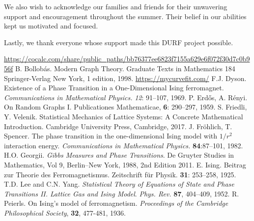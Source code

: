 \documentclass[11pt]{book}
\begin{document}
We also wish to acknowledge our families and friends for their unwavering support and encouragement throughout the summer. Their belief in our abilities kept us motivated and focused.

Lastly, we thank everyone whose support made this DURF project possible.

\begin{thebibliography}{9}
 \url{https://cocalc.com/share/public_paths/bb76377ee6823f7155a629e6f072f30d7c0b956f}
 B. Bollob\'{a}s. Modern Graph Theory. Graduate Texts in Mathematics 184 Springer-Verlag New York, 1 edition, 1998.
\url{https://mycurvefit.com/}
 F.J. Dyson. Existence of a Phase Transition in a One-Dimensional Ising ferromagnet. {\em Communications in Mathematical Physics.} {\em 12}: 91--107, 1969.
 P. Erd\H{o}s, A. R\'{e}nyi. On Random Graphs I. Publicationes Mathematicae, {\bf 6}: 290--297,  1959.
 S. Friedli, Y. Velenik. Statistical Mechanics of Lattice Systems: A Concrete Mathematical Introduction. Cambridge University Press, Cambridge, 2017.
 J. Fr\"ohlich, T. Spencer. The phase transition in the one-dimensional Ising model with $1/r^2$ interaction energy. {\em Communications in Mathematical Physics.} {\bf 84}:87--101, 1982.
 H.O. Georgii. {\em Gibbs Measures and Phase Transitions}. De Gruyter Studies in Mathematics, Vol 9, Berlin--New York, 1988, 2nd Edition 2011.
 E. Ising. Beitrag zur Theorie des Ferromagnetismus. Zeitschrift für Physik. {\bf 31}: 253--258, 1925.
T.D. Lee and C.N. Yang. {\it Statistical Theory of Equations of State and Phase Transitions II. Lattice Gas and Ising Model}. \emph{Phys. Rev.} \textbf{87}, 404--409, 1952.
 R. Peierls. On Ising's model of ferromagnetism. {\em Proceedings of the Cambridge Philosophical Society}, \textbf{32}, 477-481, 1936.
\end{thebibliography}
\end{document}
